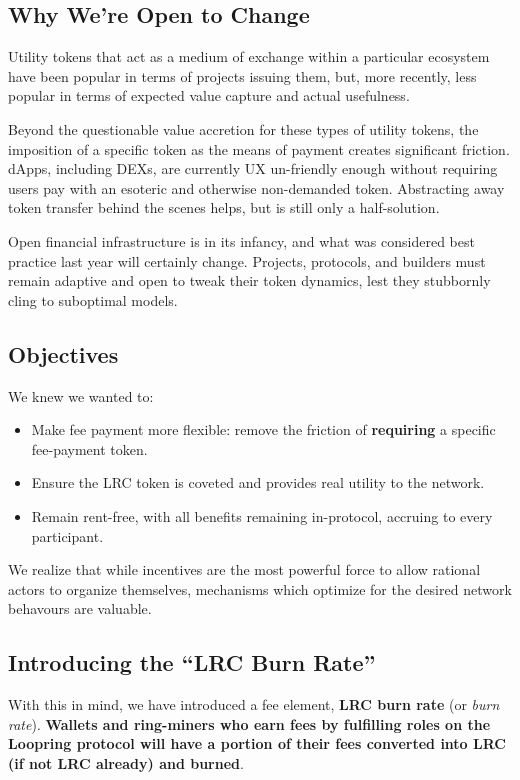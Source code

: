 \documentclass[UTF8,nofonts]{article}
\begin{document}
\begin{multicols}{2}
\begin{appendices}
\subsection{Why We’re Open to Change}

Utility tokens that act as a medium of exchange within a particular ecosystem have been popular in terms of projects issuing them, but, more recently, less popular in terms of expected value capture and actual usefulness.

Beyond the questionable value accretion for these types of utility tokens, the imposition of a specific token as the means of payment creates significant friction. dApps, including DEXs, are currently UX un-friendly enough without requiring users pay with an esoteric and otherwise non-demanded token. Abstracting away token transfer behind the scenes helps, but is still only a half-solution.

Open financial infrastructure is in its infancy, and what was considered best practice last year will certainly change. Projects, protocols, and builders must remain adaptive and open to tweak their token dynamics, lest they stubbornly cling to suboptimal models.

\subsection{Objectives}
We knew we wanted to:

\begin{itemize}
	\item Make fee payment more flexible: remove the friction of \textbf{requiring} a specific fee-payment token.
	\item Ensure the LRC token is coveted and provides real utility to the network.
	\item Remain rent-free, with all benefits remaining in-protocol, accruing to every participant.
\end{itemize}

We realize that while incentives are the most powerful force to allow rational actors to organize themselves, mechanisms which optimize for the desired network behavours are valuable. 

\subsection{Introducing the “LRC Burn Rate”}
With this in mind, we have introduced a fee element, \textbf{LRC burn rate} (or \textit{burn rate}). \textbf{Wallets and ring-miners who earn fees by fulfilling roles on the Loopring protocol will have a portion of their fees converted into LRC (if not LRC already) and burned}. 


\end{appendices}
\end{multicols}
\end{document}
